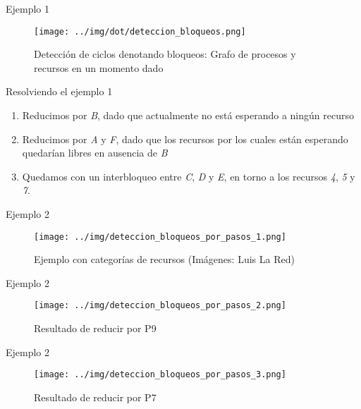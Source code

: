 \documentclass[presentation]{beamer}
\begin{document}
\begin{frame}[label={sec:orga7b27d8}]{Ejemplo 1}
\begin{figure}[htbp]
\centering
\texttt{[image: ../img/dot/deteccion\_bloqueos.png]}
\caption{Detección de ciclos denotando bloqueos: Grafo de procesos y recursos en un momento dado}
\end{figure}
\end{frame}

\begin{frame}[label={sec:orgc88fc38}]{Resolviendo el ejemplo 1}
\begin{enumerate}
\item Reducimos por \emph{B}, dado que actualmente no está esperando a ningún
recurso

\item Reducimos por \emph{A} y \emph{F}, dado que los recursos por los cuales están
esperando quedarían libres en ausencia de \emph{B}

\item Quedamos con un interbloqueo entre \emph{C}, \emph{D} y \emph{E}, en torno a los
recursos \emph{4}, \emph{5} y \emph{7}.
\end{enumerate}
\end{frame}

\begin{frame}[label={sec:orge20d48b}]{Ejemplo 2}
\begin{figure}[htbp]
\centering
\texttt{[image: ../img/deteccion\_bloqueos\_por\_pasos\_1.png]}
\caption{Ejemplo con categorías de recursos (Imágenes: Luis La Red)}
\end{figure}
\end{frame}

\begin{frame}[label={sec:org827cade}]{Ejemplo 2}
\begin{figure}[htbp]
\centering
\texttt{[image: ../img/deteccion\_bloqueos\_por\_pasos\_2.png]}
\caption{Resultado de reducir por P9}
\end{figure}
\end{frame}

\begin{frame}[label={sec:orga40d0ea}]{Ejemplo 2}
\begin{figure}[htbp]
\centering
\texttt{[image: ../img/deteccion\_bloqueos\_por\_pasos\_3.png]}
\caption{Resultado de reducir por P7}
\end{figure}
\end{frame}
\end{document}
